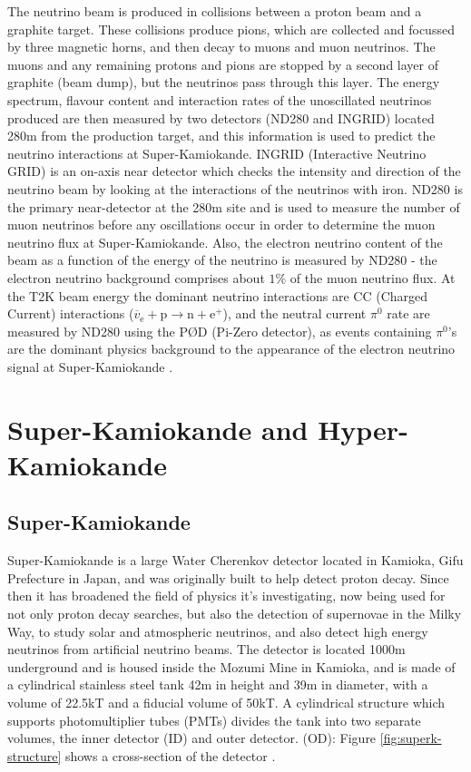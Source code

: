 \documentclass[11pt,oneside,a4paper]{article}
\begin{document}
The neutrino beam is produced in collisions between a proton beam and a graphite target. These collisions produce pions, which are collected and focussed by three magnetic horns, and then decay to muons and muon neutrinos. The muons and any remaining protons and pions are stopped by a second layer of graphite (beam dump), but the neutrinos pass through this layer. The energy spectrum, flavour content and interaction rates of the unoscillated neutrinos produced are then measured by two detectors (ND280 and INGRID) located 280m from the production target, and this information is used to predict the neutrino interactions at Super-Kamiokande. INGRID (Interactive Neutrino GRID) is an on-axis near detector which checks the intensity and direction of the neutrino beam by looking at the interactions of the neutrinos with iron. ND280 is the primary near-detector at the 280m site and is used to measure the number of muon neutrinos before any oscillations occur in order to determine the muon neutrino flux at Super-Kamiokande. Also, the electron neutrino content of the beam as a function of the energy of the neutrino is measured by ND280 - the electron neutrino background comprises about $1\%$ of the muon neutrino flux. At the T2K beam energy the dominant neutrino interactions are CC (Charged Current) interactions ($\overline{v}_{\mathrm{e}}+\mathrm{p} \rightarrow \mathrm{n}+\mathrm{e}^{+}$), and the neutral current $\pi^{0}$ rate are measured by ND280 using the P\O D (Pi-Zero detector), as events containing  $\pi^{0}$'s are the dominant physics background to the appearance of the electron neutrino signal at Super-Kamiokande \cite{pizero}.



\section{Super-Kamiokande and Hyper-Kamiokande}
\subsection{Super-Kamiokande}
Super-Kamiokande is a large Water Cherenkov detector located in Kamioka, Gifu Prefecture in Japan, and was originally built to help detect proton decay. Since then it has broadened the field of physics it's investigating, now being used for not only proton decay searches, but also the detection of supernovae in the Milky Way, to study solar and atmospheric neutrinos, and also detect high energy neutrinos from artificial neutrino beams. The detector is located 1000m underground and is housed inside the Mozumi Mine in Kamioka, and is made of a cylindrical stainless steel tank 42m in height and 39m in diameter, with a volume of 22.5kT and a fiducial volume of 50kT. A cylindrical structure which supports photomultiplier tubes (PMTs) divides the tank into two separate volumes, the inner detector (ID) and outer detector. (OD): Figure \ref{fig:superk-structure} shows a cross-section of the detector \cite{skdetector}.
\end{document}
